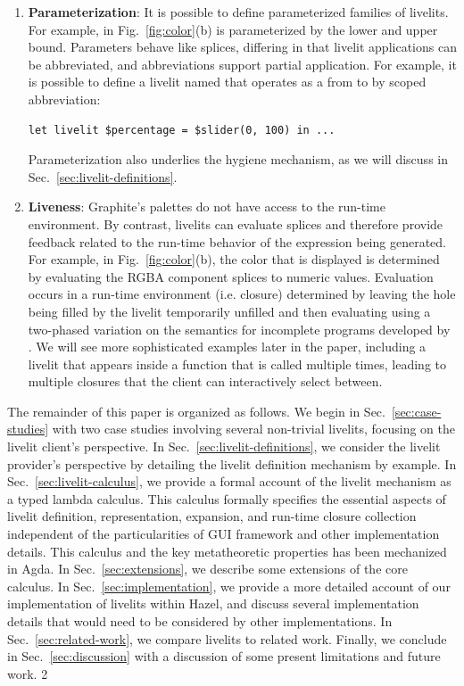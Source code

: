 \begin{enumerate}
  \item \textbf{Parameterization}: It is possible to define parameterized families of livelits. 
  For example,  in Fig.~\ref{fig:color}(b) is parameterized by the lower and upper bound. 
  Parameters behave like splices, differing in that livelit applications can be abbreviated, and abbreviations
  support partial application. For example, it is possible to define a livelit named  
  that operates as a  from  to  by scoped abbreviation:
  \begin{lstlisting}[numbers=none]
  let livelit $percentage = $slider(0, 100) in ...
  \end{lstlisting}
  Parameterization also underlies the hygiene mechanism, as we will discuss in Sec.~\ref{sec:livelit-definitions}.

  \item \textbf{Liveness}: Graphite's palettes do not have 
  access to the run-time environment. By contrast, livelits can evaluate splices
  and therefore provide feedback related to the run-time behavior of the expression being generated. 
  For example, in Fig.~\ref{fig:color}(b), the color that is displayed is determined by evaluating the RGBA 
  component splices to numeric values.
  Evaluation occurs in a run-time environment (i.e. closure) determined by 
  leaving the hole being filled by the livelit temporarily unfilled and then evaluating
  using a two-phased variation on the semantics for incomplete programs developed by \citet{HazelnutLive}. 
  We will see more sophisticated examples later in the paper, including a livelit 
  that appears inside a function that is called multiple times, leading to multiple closures that the client can 
  interactively select between.
\end{enumerate}

The remainder of this paper is organized as follows. We begin in Sec.~\ref{sec:case-studies} with two case studies 
involving several non-trivial livelits, focusing on the livelit client's perspective. 
In Sec.~\ref{sec:livelit-definitions}, we consider the livelit provider's perspective by detailing the livelit
definition mechanism by example. 
In Sec.~\ref{sec:livelit-calculus}, we provide a formal account of the livelit mechanism as a typed lambda calculus. 
This calculus formally specifies the essential aspects of livelit definition, representation, expansion, 
and run-time closure collection independent of the particularities of GUI framework and other implementation details. 
This calculus and the key metatheoretic properties has been mechanized in Agda.
In Sec.~\ref{sec:extensions}, we describe some extensions of the core calculus.
In Sec.~\ref{sec:implementation}, we provide a more detailed account of our implementation of livelits within Hazel, 
and discuss several implementation details that would need to be considered by other implementations.  
In Sec.~\ref{sec:related-work}, we compare livelits to related work. 
Finally, we conclude in Sec.~\ref{sec:discussion} with a discussion of some present limitations and future work.
2